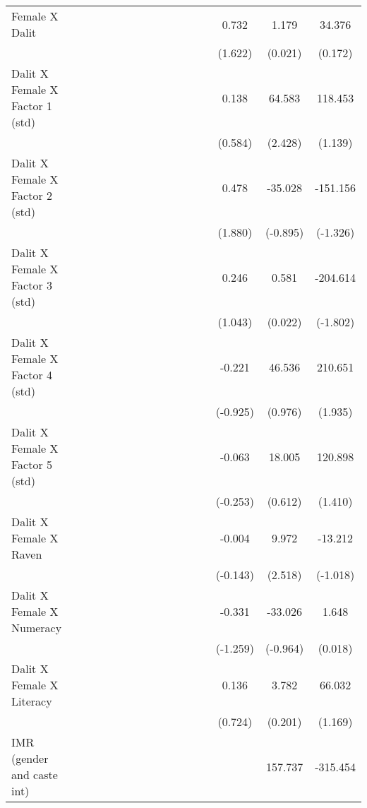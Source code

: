 {\begin{longtable}{@{\extracolsep{\fill}}lccccccccccccccc}
    Female X Dalit &   &   &   &   &   &   &   &   &   &   &   &   & 0.732 & 1.179 & 34.376 \\
      &   &   &   &   &   &   &   &   &   &   &   &   & (1.622) & (0.021) & (0.172) \\
    Dalit X Female X Factor 1 (std) &   &   &   &   &   &   &   &   &   &   &   &   & 0.138 & 64.583 & 118.453 \\
      &   &   &   &   &   &   &   &   &   &   &   &   & (0.584) & (2.428) & (1.139) \\
    Dalit X Female X Factor 2 (std) &   &   &   &   &   &   &   &   &   &   &   &   & 0.478 & -35.028 & -151.156 \\
      &   &   &   &   &   &   &   &   &   &   &   &   & (1.880) & (-0.895) & (-1.326) \\
    Dalit X Female X Factor 3 (std) &   &   &   &   &   &   &   &   &   &   &   &   & 0.246 & 0.581 & -204.614 \\
      &   &   &   &   &   &   &   &   &   &   &   &   & (1.043) & (0.022) & (-1.802) \\
    Dalit X Female X Factor 4 (std) &   &   &   &   &   &   &   &   &   &   &   &   & -0.221 & 46.536 & 210.651 \\
      &   &   &   &   &   &   &   &   &   &   &   &   & (-0.925) & (0.976) & (1.935) \\
    Dalit X Female X Factor 5 (std) &   &   &   &   &   &   &   &   &   &   &   &   & -0.063 & 18.005 & 120.898 \\
      &   &   &   &   &   &   &   &   &   &   &   &   & (-0.253) & (0.612) & (1.410) \\
    Dalit X Female X Raven &   &   &   &   &   &   &   &   &   &   &   &   & -0.004 & 9.972 & -13.212 \\
      &   &   &   &   &   &   &   &   &   &   &   &   & (-0.143) & (2.518) & (-1.018) \\
    Dalit X Female X Numeracy &   &   &   &   &   &   &   &   &   &   &   &   & -0.331 & -33.026 & 1.648 \\
      &   &   &   &   &   &   &   &   &   &   &   &   & (-1.259) & (-0.964) & (0.018) \\
    Dalit X Female X Literacy &   &   &   &   &   &   &   &   &   &   &   &   & 0.136 & 3.782 & 66.032 \\
      &   &   &   &   &   &   &   &   &   &   &   &   & (0.724) & (0.201) & (1.169) \\
    IMR (gender and caste int) &   &   &   &   &   &   &   &   &   &   &   &   &   & 157.737 & -315.454 \\

\end{longtable}}
